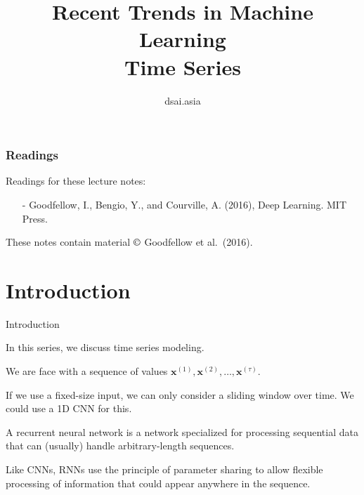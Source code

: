 \documentclass{beamer}
\title[RTML]{Recent Trends in Machine Learning\\Time Series}
\author{dsai.asia}
\institute[]{Asian Data Science and Artificial Intelligence Master's Program}
\date{}
\renewcommand{\vec}[1]{\boldsymbol{#1}}
\begin{document}


\frame{\titlepage}

%

\begin{frame}
\frametitle{Readings}

Readings for these lecture notes:
\begin{itemize}
\item[-] Goodfellow, I., Bengio, Y., and Courville, A. (2016),
  Deep Learning. MIT Press.
\end{itemize}

These notes contain material $\copyright$ Goodfellow et al.\ (2016).

\end{frame}

\section{Introduction}

\begin{frame}{Introduction}

  In this series, we discuss time series modeling.

  \medskip

  We are face with a sequence of values $\vec{x}^{(1)}, \vec{x}^{(2)},
  \ldots, \vec{x}^{(\tau)}$.

  \medskip

  If we use a fixed-size input, we can only consider a \alert{sliding
    window} over time. We could use a 1D CNN for this.

  \medskip
  
  A \alert{recurrent neural network} is a network specialized for
  processing sequential data that can (usually) handle
  arbitrary-length sequences.

  \medskip

  Like CNNs, RNNs use the principle of \alert{parameter sharing}
  to allow flexible processing of information that could appear anywhere
  in the sequence.

\end{frame}
\end{document}
